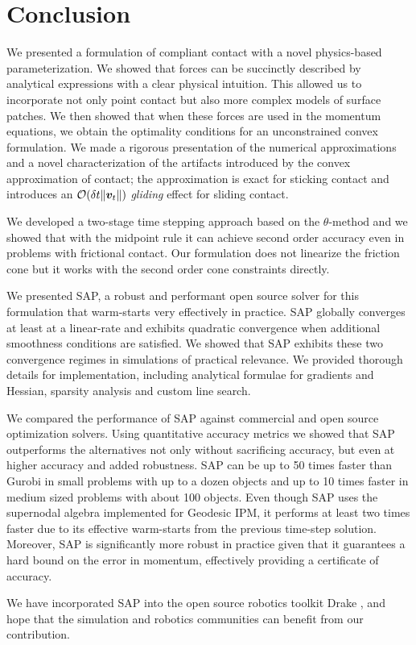 \section{Conclusion}
\label{sec:future_directions}

We presented a formulation of compliant contact with a novel physics-based
parameterization. We showed that forces can be succinctly described by
analytical expressions with a clear physical intuition. This allowed us to
incorporate not only point contact but also more complex models of surface
patches. We then showed that when these forces are used in the momentum
equations, we obtain the optimality conditions for an unconstrained convex
formulation. We made a rigorous presentation of the numerical approximations and
a novel characterization of the artifacts introduced by the convex approximation
of contact; the approximation is exact for sticking contact and introduces an
$\mathcal{O}(\delta t\|{\bm{v}}_t\|)$ \emph{gliding} effect for sliding contact.

We developed a two-stage time stepping approach based on the
$\theta\text{-method}$ and we showed that with the midpoint rule it can achieve
second order accuracy even in problems with frictional contact. Our formulation
does not linearize the friction cone but it works with the second order cone
constraints directly.

We presented SAP, a robust and performant open source solver for this
formulation that warm-starts very effectively in practice. SAP globally
converges at least at a linear-rate and exhibits quadratic convergence when
additional smoothness conditions are satisfied. We showed that SAP exhibits
these two convergence regimes in simulations of practical relevance. We provided
thorough details for implementation, including analytical formulae for gradients
and Hessian, sparsity analysis and custom line search.

We compared the performance of SAP against commercial and open source
optimization solvers. Using quantitative accuracy metrics we showed that SAP
outperforms the alternatives not only without sacrificing accuracy, but even at
higher accuracy and added robustness. SAP can be up to 50 times faster than
Gurobi in small problems with up to a dozen objects and up to 10 times faster in
medium sized problems with about 100 objects. Even though SAP uses the
supernodal algebra implemented for Geodesic IPM, it performs at least two times
faster due to its effective warm-starts from the previous time-step solution.
Moreover, SAP is significantly more robust in practice given that it guarantees
a hard bound on the error in momentum, effectively providing a certificate of
accuracy.

We have incorporated SAP into the open source robotics toolkit Drake
\cite{bib:drake}, and hope that the simulation and robotics communities can
benefit from our contribution.
